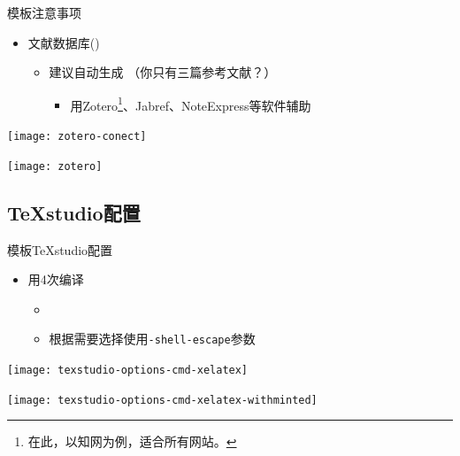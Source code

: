 \documentclass[fontset = adobe, xcolor=svgnames, t, aspectratio=169]{ctexbeamer}
\begin{document}
\begin{frame}{\nwafuthesis 模板}{注意事项}
  \begin{itemize}
  \item 文献数据库()
    \begin{itemize}
    \item 建议自动生成 （你只有三篇参考文献？）

      \begin{itemize}
      \item 用Zotero\footnote[frame,1]{在此，以知网为例，适合所有网站。}、Jabref、NoteExpress等软件辅助
      \end{itemize}
      
    \end{itemize}
  \end{itemize}
  \centering
  \vspace{6ex}
  \begin{annotatedFigure}
    {\texttt{[image: zotero-conect]}}
  \end{annotatedFigure}\quad%
  \begin{annotatedFigure}
    {\texttt{[image: zotero]}}
  \end{annotatedFigure}
\end{frame}

\subsection[TeXstudio]{TeXstudio配置}
\begin{frame}{\nwafuthesis 模板}{TeXstudio配置}
  \stretchon
  \begin{itemize}
  \item 用\XeLaTeX \alert{4次}编译
    \begin{itemize}
    \item {}
    \item 根据需要选择使用\texttt{-shell-escape}参数
    \end{itemize}
  \end{itemize}
  \centering
  \begin{annotatedFigure}
    {\texttt{[image: texstudio-options-cmd-xelatex]}}
  \end{annotatedFigure}
  \begin{annotatedFigure}
    {\texttt{[image: texstudio-options-cmd-xelatex-withminted]}}
  \end{annotatedFigure}  
  \stretchoff
\end{frame}
\end{document}

